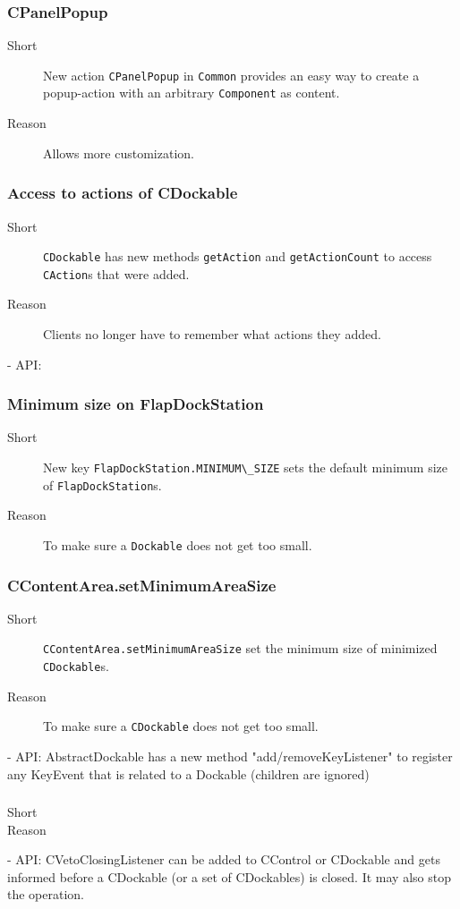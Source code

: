 \documentclass[a4paper,10pt]{article}
\newcommand{\src}[1]{\lstinline[basicstyle=\normalsize\ttfamily,keywordstyle=\normalsize\ttfamily,identifierstyle=\normalsize\ttfamily]|#1|}
\newcommand{\short}{\item[Short]}
\newcommand{\why}{\item[Reason]}
\begin{document}
\subsubsection{CPanelPopup}
\begin{description}
 \short New action \src{CPanelPopup} in \src{Common} provides an easy way to create a popup-action with an arbitrary \src{Component} as content.
 \why Allows more customization.
\end{description}

\subsubsection{Access to actions of CDockable}
\begin{description}
 \short \src{CDockable} has new methods \src{getAction} and \src{getActionCount} to access \src{CAction}s that were added. 
 \why Clients no longer have to remember what actions they added.
\end{description}

- API: 
\subsubsection{Minimum size on FlapDockStation}
\begin{description}
 \short New key \src{FlapDockStation.MINIMUM\_SIZE} sets the default minimum size of \src{FlapDockStation}s.
 \why To make sure a \src{Dockable} does not get too small.
\end{description}

\subsubsection{CContentArea.setMinimumAreaSize}
\begin{description}
 \short \src{CContentArea.setMinimumAreaSize} set the minimum size of minimized \src{CDockable}s.
 \why To make sure a \src{CDockable} does not get too small.
\end{description}

- API: AbstractDockable has a new method "add/removeKeyListener" to register any KeyEvent that is related to a Dockable (children are ignored)
\subsubsection{}
\begin{description}
 \short 
 \why 
\end{description}
- API: CVetoClosingListener can be added to CControl or CDockable and gets informed before a CDockable (or a set of CDockables) is closed. It may also stop the operation. 
\end{document}
